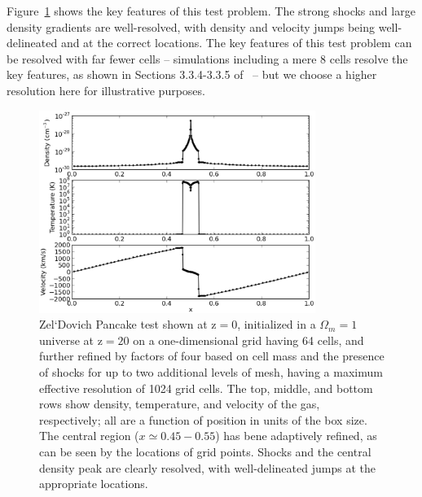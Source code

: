 Figure~\ref{fig.pancake} shows the key features of this test problem.
The strong shocks and large density gradients are well-resolved, with
density and velocity jumps being well-delineated and at the correct locations.  The key features of
this test problem can be resolved with far fewer cells -- simulations
including a mere 8 cells resolve the key features, as shown in
Sections 3.3.4-3.3.5 of~\citet{1996PhDT........80B} -- but we choose a
higher resolution here for illustrative purposes.

\begin{figure}
\begin{center}
\includegraphics[width=0.8\textwidth]{figures/AMRZeldovichPancake.eps}
\caption{Zel`Dovich Pancake test shown at z$ = 0$, initialized in a
$\Omega_m = 1$ universe at z$ = 20$ on a one-dimensional grid having
64 cells, and further refined by factors of four based on cell mass
and the presence of shocks for up to two additional levels of mesh,
having a maximum effective resolution of 1024 grid cells. The top,
middle, and bottom rows show density, temperature, and velocity of the
gas, respectively; all are a function of position in units of the box
size.  The central region ($x \simeq 0.45-0.55$) has bene adaptively
refined, as can be seen by the locations of grid points.  Shocks and
the central density peak are clearly resolved, with well-delineated
jumps at the appropriate locations.}
\label{fig.pancake}
\end{center}
\end{figure}



